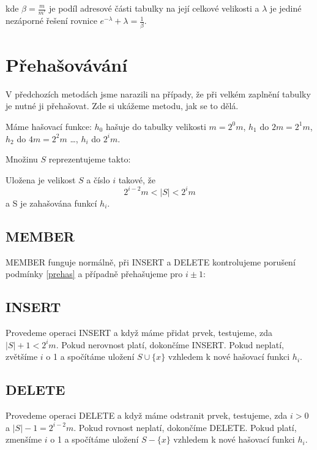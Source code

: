 kde $\beta = \frac m{m'}$ je podíl adresové části tabulky na její
celkové velikosti
a $\lambda$ je jediné nezáporné řešení rovnice 
$e^{-\lambda} + \lambda = \frac1\beta$.


\section{Přehašovávání}

V předchozích metodách jsme narazili na případy, že při velkém
zaplnění tabulky je nutné ji přehašovat. Zde si ukážeme metodu, jak se to
dělá.

Máme hašovací funkce: $h_0$ hašuje do tabulky velikosti $m = 2^0 m$,
$h_1$ do $2m = 2^1 m$, $h_2$ do $4m = 2^2 m$ \ldots, $h_i$ do $2^i
m$.

\vspace{10mm}

\begin{samepage}
\noindent
Množinu $S$ reprezentujeme takto:

Uložena je velikost $S$ a číslo $i$ takové, že
\begin{equation}
\label{prehas}
2^{i-2} m < |S| < 2^i m
\end{equation}
a S je zahašována funkcí $h_i$.
\end{samepage}

\subsection{MEMBER}

MEMBER funguje normálně, při INSERT a DELETE kontrolujeme porušení
podmínky \eqref{prehas} a případně přehašujeme pro $i \pm 1$:

\subsection{INSERT}

Provedeme operaci INSERT a když máme přidat prvek, testujeme,
zda $|S|+1 < 2^i m$. Pokud nerovnost platí, dokončíme INSERT. Pokud
neplatí, zvětšíme $i$ o 1 a spočítáme uložení $S \cup \{x\}$ vzhledem
k nové hašovací funkci $h_i$.

\subsection{DELETE}

Provedeme operaci DELETE a když máme odstranit prvek, testujeme,
zda $i>0$ a $|S|-1 = 2^{i-2} m$. Pokud rovnost neplatí, dokončíme DELETE. Pokud
platí, zmenšíme $i$ o 1 a spočítáme uložení $S - \{x\}$ vzhledem
k nové hašovací funkci $h_i$.

